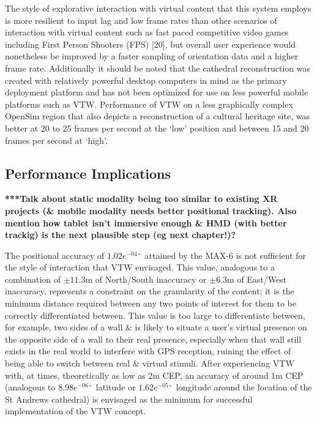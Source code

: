 The style of explorative interaction with virtual content that this system employs is more resilient to input lag and low frame rates than other scenarios of interaction with virtual content such as fast paced competitive video games including First Person Shooters (FPS) [20], but overall user experience would nonetheless be improved by a faster sampling of orientation data and a higher frame rate. Additionally it should be noted that the cathedral reconstruction was created with relatively powerful desktop computers in mind as the primary deployment platform and has not been optimized for use on less powerful mobile platforms such as VTW. Performance of VTW on a less graphically complex OpenSim region that also depicts a reconstruction of a cultural heritage site, was better at 20 to 25 frames per second at the `low' position and between 15 and 20 frames per second at `high'.



\subsection{Performance Implications}

\textbf{***Talk about static modality being too similar to existing XR projects (\& mobile modality needs better positional tracking). Also mention how tablet isn't immersive enough \& HMD (with better trackig) is the next plausible step (eg next chapter!)?}

The positional accuracy of $1.02e^{-04\circ}$ attained by the MAX-6 is not sufficient for the style of interaction that VTW envisaged. This value, analogous to a combination of $\pm11.3$m of North/South inaccuracy or $\pm6.3$m of East/West inaccuracy, represents a constraint on the granularity of the content; it is the minimum distance required between any two points of interest for them to be correctly differentiated between. This value is too large to differentiate between, for example, two sides of a wall \& is likely to situate a user's virtual presence on the opposite side of a wall to their real presence, especially when that wall still exists in the real world to interfere with GPS reception, ruining the effect of being able to switch between real \& virtual stimuli. After experiencing VTW with, at times, theoretically as low as 2m CEP, an accuracy of around 1m CEP (analogous to $8.98e^{-06\circ}$ latitude or $1.62e^{-05\circ}$ longitude around the location of the St Andrews cathedral) is envisaged as the minimum for successful implementation of the VTW concept.

